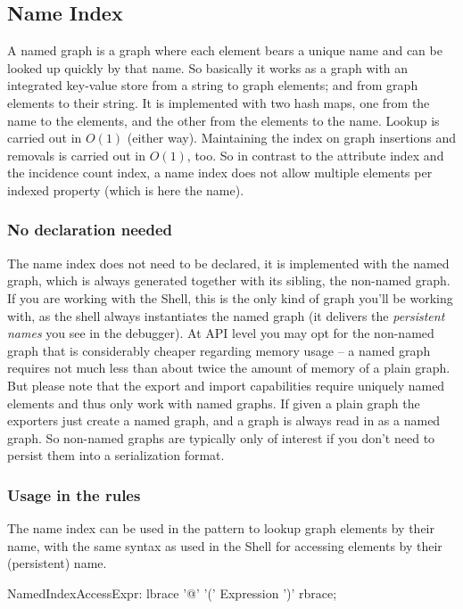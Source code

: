 \subsection{Name Index}\label{sec:nameindex}
A named graph is a graph where each element bears a unique name and can be looked up quickly by that name.
So basically it works as a graph with an integrated key-value store from a string to graph elements; and from graph elements to their string.
It is implemented with two hash maps, one from the name to the elements, and the other from the elements to the name.
Lookup is carried out in $O(1)$ (either way).
Maintaining the index on graph insertions and removals is carried out in $O(1)$, too.
So in contrast to the attribute index and the incidence count index, a name index does not allow multiple elements per indexed property (which is here the name).

\subsubsection*{No declaration needed}
The name index does not need to be declared, it is implemented with the named graph, which is always generated together with its sibling, the non-named graph.
If you are working with the Shell, this is the only kind of graph you'll be working with, as the shell always instantiates the named graph (it delivers the \emph{persistent names} you see in the debugger).
At API level you may opt for the non-named graph that is considerably cheaper regarding memory usage -- a named graph requires not much less than about twice the amount of memory of a plain graph.
But please note that the export and import capabilities require uniquely named elements and thus only work with named graphs.
If given a plain graph the exporters just create a named graph, and a graph is always read in as a named graph.
So non-named graphs are typically only of interest if you don't need to persist them into a serialization format.

\subsubsection*{Usage in the rules}
The name index can be used in the pattern to lookup graph elements by their name, with the same syntax as used in the Shell for accessing elements by their (persistent) name.

\begin{rail}
  NamedIndexAccessExpr:
    lbrace '@' '(' Expression ')' rbrace;
\end{rail}

